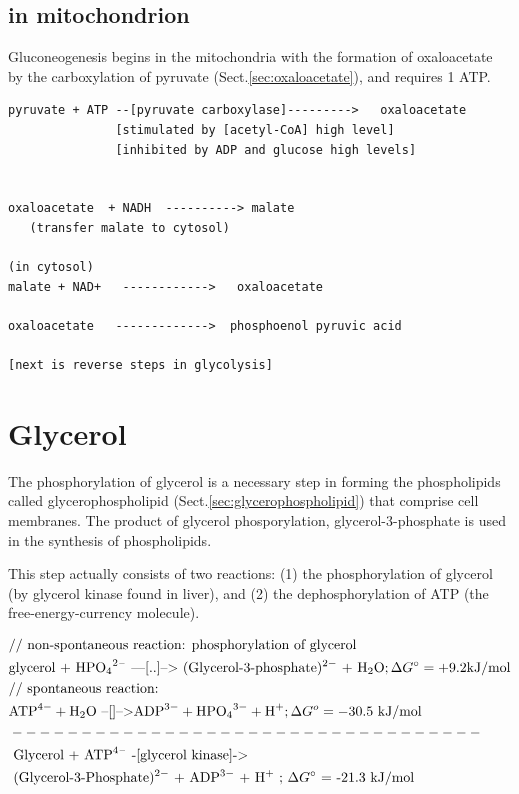 \subsection{in mitochondrion}

Gluconeogenesis begins in the mitochondria with the formation of oxaloacetate by
the carboxylation of pyruvate (Sect.\ref{sec:oxaloacetate}), and requires 1 ATP.

\begin{verbatim}
pyruvate + ATP --[pyruvate carboxylase]--------->   oxaloacetate
               [stimulated by [acetyl-CoA] high level]
               [inhibited by ADP and glucose high levels]


oxaloacetate  + NADH  ----------> malate
   (transfer malate to cytosol)

(in cytosol)
malate + NAD+   ------------>   oxaloacetate

oxaloacetate   ------------->  phosphoenol pyruvic acid

[next is reverse steps in glycolysis]
\end{verbatim}

\section{Glycerol}
\label{sec:glycerol}
\label{sec:glycerol-phosphorylation}

The phosphorylation of glycerol is a necessary step in forming the phospholipids
called glycerophospholipid (Sect.\ref{sec:glycerophospholipid}) that comprise cell
membranes. The product of glycerol phosporylation, glycerol-3-phosphate  is used
in the synthesis of phospholipids.

This step actually consists of two reactions: (1) the phosphorylation of
glycerol (by glycerol kinase found in liver), and (2) the dephosphorylation of
ATP (the free-energy-currency molecule).

{\tiny
\begin{equation}
\begin{split}
&\text{// non-spontaneous reaction: phosphorylation of glycerol} \\
&\text{glycerol +  \ce{HPO_4^{2-}}  ---[..]-->
 (Glycerol-3-phosphate)$^{2-}$ + \ce{H2O}} ;  \Delta G^\circ = +9.2 \text{kJ/mol} \\
&\text{// spontaneous reaction:} \\
&\ce{ATP^{4-}  + H2O} \text{ --[]-->} \ce{ADP^{3-} + HPO_4^{3-} + H+}  ;
 \Delta G^o = -30.5 \text{ kJ/mol} \\
&---------------------------------- \\
&\text{   Glycerol + \ce{ATP^{4-}} -[glycerol kinase]-> } \\
&\text{        (Glycerol-3-Phosphate)$^{2-}$ + ADP$^{3-}$ + H$^{+}$  ;
$\Delta G^\circ$ = -21.3 kJ/mol}
\end{split}
\end{equation}
}

